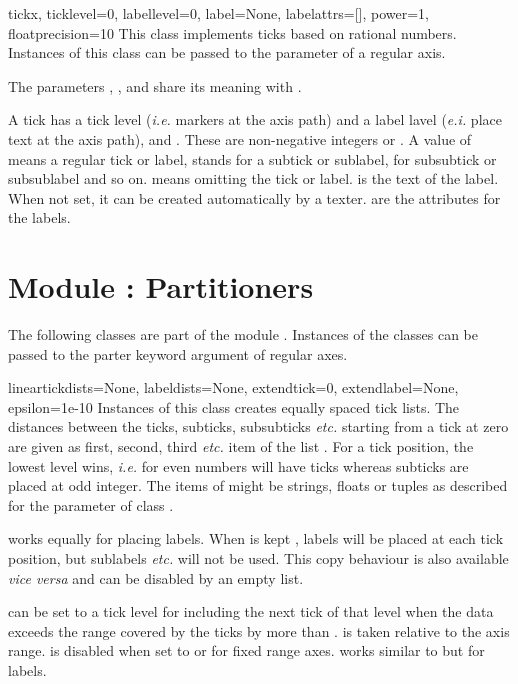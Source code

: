 \begin{classdesc}{tick}{x, ticklevel=0, labellevel=0, label=None,
                        labelattrs=[], power=1, floatprecision=10}
  This class implements ticks based on rational numbers. Instances of
  this class can be passed to the  parameter of a
  regular axis.

  The parameters , , and  share
  its meaning with .

  A tick has a tick level (\emph{i.e.} markers at the axis path) and a
  label lavel (\emph{e.i.} place text at the axis path),
   and . These are non-negative
  integers or . A value of  means a regular tick or
  label,  stands for a subtick or sublabel,  for
  subsubtick or subsublabel and so on.  means omitting the
  tick or label.  is the text of the label. When not set,
  it can be created automatically by a texter.  are
  the attributes for the labels.
\end{classdesc} %

\section{Module : Partitioners} %


The following classes are part of the module .
Instances of the classes can be passed to the parter keyword argument
of regular axes.

\begin{classdesc}{linear}{tickdists=None, labeldists=None,
                          extendtick=0, extendlabel=None,
                          epsilon=1e-10}
  Instances of this class creates equally spaced tick lists. The
  distances between the ticks, subticks, subsubticks \emph{etc.}
  starting from a tick at zero are given as first, second, third
  \emph{etc.} item of the list . For a tick position,
  the lowest level wins, \emph{i.e.} for \code{[2, 1]} even numbers
  will have ticks whereas subticks are placed at odd integer. The
  items of  might be strings, floats or tuples as
  described for the  parameter of class .

   works equally for placing labels. When
   is kept , labels will be placed at each
  tick position, but sublabels \emph{etc.} will not be used. This copy
  behaviour is also available \emph{vice versa} and can be disabled by
  an empty list.

   can be set to a tick level for including the next
  tick of that level when the data exceeds the range covered by the
  ticks by more than .  is taken relative
  to the axis range.  is disabled when set to
   or for fixed range axes.  works similar
  to  but for labels.
\end{classdesc}

